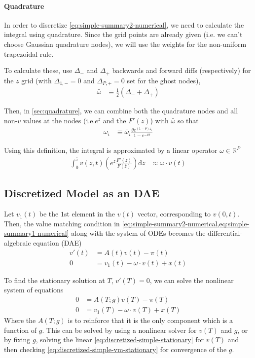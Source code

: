 \documentclass[11pt]{article}
\newcommand{\R}{\ensuremath{\mathbb{R}}}
\newcommand{\diff}{\ensuremath{\mathrm{d}}}
\begin{document}
\paragraph{Quadrature}
In order to discretize \cref{eq:simple-summary2-numerical}, we need to calculate the integral using quadrature.  Since the grid points are already given (i.e. we can't choose Gaussian quadrature nodes), we will use the weights for the non-uniform trapezoidal rule.

To calculate these, use $\Delta_{-}$ and $\Delta_{+}$ backwards and forward diffs (respectively) for the $z$ grid (with $\Delta_{1,-} = 0$ and $\Delta_{P,+} = 0$ set for the ghost nodes),
\begin{align}
\bar{\omega}&\equiv \frac1{2}(\Delta_{-} + \Delta_{+})
\end{align}

Then, in \cref{sec:quadrature}, we can combine both the quadrature nodes and all non-$v$ values at the nodes (i.e.$e^z$ and the $F'(z)$) with $\bar{\omega}$ so that
\begin{align}
\omega_i &\equiv \bar{\omega}_i \frac{\theta e^{(1 - \theta)z_i}}{1 - e^{-\theta \bar{z}}}
\end{align}

\noindent Using this definition, the integral is approximated by a linear operator $\omega\in\R^P$
\begin{align}
 \int_{0}^{\bar{z}}  v(z,t) \left(e^z \frac{F'(z)}{F(\bar{z})}\right) \diff z &\approx \omega \cdot v(t)
\end{align}

\subsection{Discretized Model as an DAE}
Let $v_1(t)$ be the $1$st element in the $v(t)$ vector, corresponding to $v(0,t)$.  Then, the value matching condition in \cref{eq:simple-summary2-numerical,eq:simple-summary1-numerical} along with the system of ODEs becomes the differential-algebraic equation (DAE)
\begin{align}
	v'(t) &= A(t) v(t) - \pi(t)\label{eq:discretized-simple}\\
	0 &= v_1(t) - \omega \cdot v(t) + x(t)\label{eq:discretized-simple-vm}
\end{align}


\noindent To find the stationary solution at $T$,  $v'(T) = 0$, we can solve the nonlinear system of equations
\begin{align}
	0 &= A(T; g) v(T) - \pi(T)\label{eq:discretized-simple-stationary}\\
	0 &= v_1(T) - \omega \cdot v(T) + x(T)\label{eq:discretized-simple-vm-stationary}
\end{align}
Where the $ A(T; g)$ is to reinforce that it is the only component which is a function of $g$.  This can be solved by using a nonlinear solver for $v(T)$ and $g$, or by fixing $g$, solving the linear \cref{eq:discretized-simple-stationary} for $v(T)$ and then checking \cref{eq:discretized-simple-vm-stationary} for convergence of the $g$.
\end{document}
